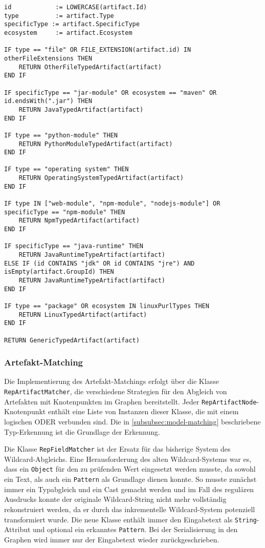 \begin{lstlisting}[language=pseudo,caption={Typisierung eines Artefakts basierend auf Attributen},label=lst:artifact-typing-code,basicstyle=\ttfamily\scriptsize]
id            := LOWERCASE(artifact.Id)
type          := artifact.Type
specificType := artifact.SpecificType
ecosystem     := artifact.Ecosystem

IF type == "file" OR FILE_EXTENSION(artifact.id) IN otherFileExtensions THEN
    RETURN OtherFileTypedArtifact(artifact)
END IF

IF specificType == "jar-module" OR ecosystem == "maven" OR id.endsWith(".jar") THEN
    RETURN JavaTypedArtifact(artifact)
END IF

IF type == "python-module" THEN
    RETURN PythonModuleTypedArtifact(artifact)
END IF

IF type == "operating system" THEN
    RETURN OperatingSystemTypedArtifact(artifact)
END IF

IF type IN ["web-module", "npm-module", "nodejs-module"] OR specificType == "npm-module" THEN
    RETURN NpmTypedArtifact(artifact)
END IF

IF specificType == "java-runtime" THEN
    RETURN JavaRuntimeTypeArtifact(artifact)
ELSE IF (id CONTAINS "jdk" OR id CONTAINS "jre") AND isEmpty(artifact.GroupId) THEN
    RETURN JavaRuntimeTypeArtifact(artifact)
END IF

IF type == "package" OR ecosystem IN linuxPurlTypes THEN
    RETURN LinuxTypedArtifact(artifact)
END IF

RETURN GenericTypedArtifact(artifact)
\end{lstlisting}

\subsubsection{Artefakt-Matching}

Die Implementierung des Artefakt-Matchings erfolgt über die Klasse \texttt{RepArtifactMatcher}, die verschiedene Strategien für den Abgleich von Artefakten mit Knotenpunkten im Graphen bereitstellt.
Jeder \texttt{RepArtifactNode}-Knotenpunkt enthält eine Liste von Instanzen dieser Klasse, die mit einem logischen ODER verbunden sind.
Die in \autoref{subsubsec:model-matching} beschriebene Typ-Erkennung ist die Grundlage der Erkennung.

Die Klasse \texttt{RepFieldMatcher} ist der Ersatz für das bisherige System des Wildcard-Abgleichs.
Eine Herausforderung des alten Wildcard-Systems war es, dass ein \texttt{Object} für den zu prüfenden Wert eingesetzt werden musste, da sowohl ein Text, als auch ein \texttt{Pattern} als Grundlage dienen konnte.
So musste zunächst immer ein Typabgleich und ein Cast gemacht werden und im Fall des regulären Ausdrucks konnte der originale Wildcard-String nicht mehr vollständig rekonstruiert werden, da er durch das inkrementelle Wildcard-System potenziell transformiert wurde.
Die neue Klasse enthält immer den Eingabetext als \texttt{String}-Attribut und optional ein erkanntes \texttt{Pattern}.
Bei der Serialisierung in den Graphen wird immer nur der Eingabetext wieder zurückgeschrieben.

